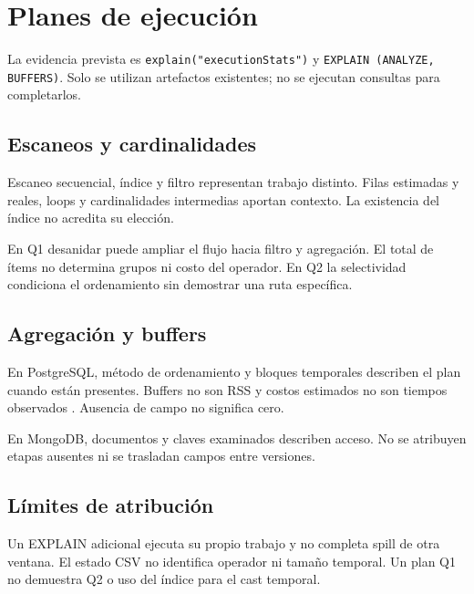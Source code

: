 \section{Planes de ejecución}
La evidencia prevista es \texttt{explain("executionStats")} y
\texttt{EXPLAIN (ANALYZE, BUFFERS)}. Solo se utilizan artefactos existentes;
no se ejecutan consultas para completarlos.


\subsection{Escaneos y cardinalidades}
Escaneo secuencial, índice y filtro representan trabajo distinto.
Filas estimadas y reales, loops y cardinalidades intermedias aportan
contexto. La existencia del índice no acredita su elección.

En Q1 desanidar puede ampliar el flujo hacia filtro y agregación.
El total de ítems no determina grupos ni costo del operador.
En Q2 la selectividad condiciona el ordenamiento sin demostrar una
ruta específica.

\subsection{Agregación y buffers}
En PostgreSQL, método de ordenamiento y bloques temporales describen el
plan cuando están presentes. Buffers no son RSS y costos estimados no
son tiempos observados \cite{pgexplain}. Ausencia de campo no significa cero.

En MongoDB, documentos y claves examinados describen acceso. No se
atribuyen etapas ausentes ni se trasladan campos entre versiones.

\subsection{Límites de atribución}
Un EXPLAIN adicional ejecuta su propio trabajo y no completa spill de
otra ventana. El estado CSV no identifica operador ni tamaño temporal.
Un plan Q1 no demuestra Q2 o uso del índice para el cast temporal.
